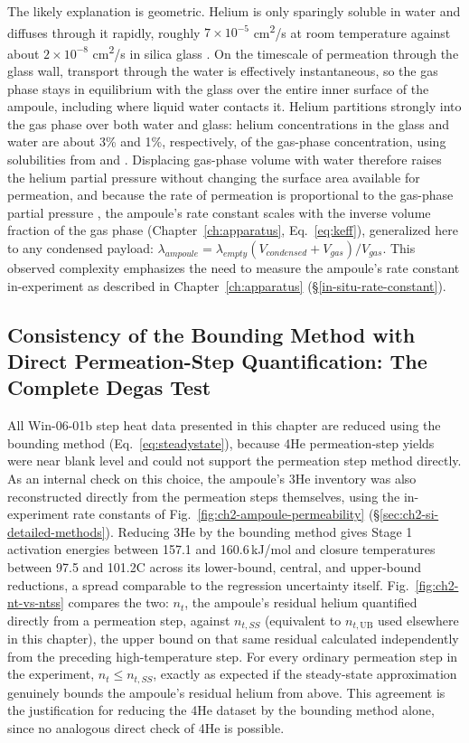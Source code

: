 The likely explanation is geometric. Helium is only sparingly soluble in water and diffuses through it rapidly,
roughly $7\times10^{-5}$ cm\textsuperscript{2}/s at room temperature \citep{verhallen1984} against about
$2\times10^{-8}$ cm\textsuperscript{2}/s in silica glass \citep{swets1961}. On the timescale of permeation through
the glass wall, transport through the water is effectively instantaneous, so the gas phase stays in equilibrium with
the glass over the entire inner surface of the ampoule, including where liquid water contacts it. Helium partitions
strongly into the gas phase over both water and glass: helium concentrations in the glass and water are about 3\% and
1\%, respectively, of the gas-phase concentration, using solubilities from \citet{sander2015} and \citet{swets1961}.
Displacing gas-phase volume with water therefore raises the helium partial pressure without changing the surface area
available for permeation, and because the rate of permeation is proportional to the gas-phase partial pressure
\citep{norton1953,altemose1961,swets1961,masaryk1968}, the ampoule's rate constant scales with the inverse volume
fraction of the gas phase (Chapter~\ref{ch:apparatus}, Eq.~\eqref{eq:keff}), generalized here to any condensed payload:
$\lambda_{ampoule} = \lambda_{empty}\left(V_{condensed} + V_{gas}\right)/V_{gas}$. This observed complexity emphasizes
the need to measure the ampoule's rate constant in-experiment as described in Chapter~\ref{ch:apparatus}
(\S\ref{in-situ-rate-constant}).

\subsection{Consistency of the Bounding Method with Direct Permeation-Step Quantification: The Complete Degas Test}\label{complete-degas-test}

All Win-06-01b step heat data presented in this chapter are reduced using the bounding method (Eq.~\eqref{eq:steadystate}), because 4He permeation-step yields were near blank level and could not support the permeation step method directly. As an internal check on this choice, the ampoule's 3He inventory was also reconstructed directly from the permeation steps themselves, using the in-experiment rate constants of Fig.~\ref{fig:ch2-ampoule-permeability} (\S\ref{sec:ch2-si-detailed-methods}). Reducing 3He by the bounding method gives Stage 1 activation energies between 157.1 and 160.6\,kJ/mol and closure temperatures between 97.5 and 101.2\textdegree C across its lower-bound, central, and upper-bound reductions, a spread comparable to the regression uncertainty itself. Fig.~\ref{fig:ch2-nt-vs-ntss} compares the two: $n_t$, the ampoule's residual helium quantified directly from a permeation step, against $n_{t,SS}$ (equivalent to $n_{t,\mathrm{UB}}$ used elsewhere in this chapter), the upper bound on that same residual calculated independently from the preceding high-temperature step. For every ordinary permeation step in the experiment, $n_t \leq n_{t,SS}$, exactly as expected if the steady-state approximation genuinely bounds the ampoule's residual helium from above. This agreement is the justification for reducing the 4He dataset by the bounding method alone, since no analogous direct check of 4He is possible.

